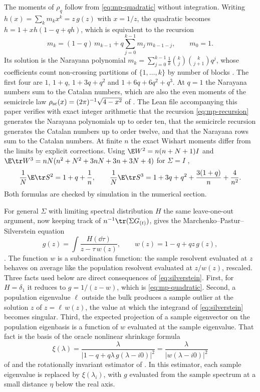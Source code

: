 The moments of $\rho_q$ follow from \eqref{eq:mp-quadratic} without integration. Writing $h(x)=\sum_k m_kx^k=z\,g(z)$ with $x=1/z$, the quadratic becomes $h=1+xh(1-q+qh)$, which is equivalent to the recursion
\begin{equation}
 m_k=(1-q)\,m_{k-1}+q\sum_{j=0}^{k-1}m_j\,m_{k-1-j},\qquad m_0=1.
 \label{eq:mp-recursion}
\end{equation}
Its solution is the Narayana polynomial $m_k=\sum_{j=0}^{k-1}\tfrac1k\binom kj\binom k{j+1}q^j$, whose coefficients count non-crossing partitions of $\{1,\ldots,k\}$ by number of blocks \citep{stanley1999enumerative,nica2006lectures}. The first four are $1$, $1+q$, $1+3q+q^2$ and $1+6q+6q^2+q^3$. At $q=1$ the Narayana numbers sum to the Catalan numbers, which are also the even moments of the semicircle law $\rho_{\rm sc}(x)=(2\pi)^{-1}\sqrt{4-x^2}$ of \citet{wigner1955characteristic,wigner1958distribution}. The Lean file accompanying this paper verifies with exact integer arithmetic that the recursion \eqref{eq:mp-recursion} generates the Narayana polynomials up to order ten, that the semicircle recursion generates the Catalan numbers up to order twelve, and that the Narayana rows sum to the Catalan numbers. At finite $n$ the exact Wishart moments differ from the limits by explicit corrections. Using $\E W^2=n(n+N+1)I$ and $\E\tr W^3=nN(n^2+N^2+3nN+3n+3N+4)$ for $\Sigma=I$ \citep{muirhead1982aspects},
\[
 \frac1N\E\tr S^2=1+q+\frac1n,\qquad
 \frac1N\E\tr S^3=1+3q+q^2+\frac{3(1+q)}n+\frac4{n^2}.
\]
Both formulas are checked by simulation in the numerical section.

For general $\Sigma$ with limiting spectral distribution $H$ the same leave-one-out argument, now keeping track of $n^{-1}\tr(\Sigma G_{(t)})$, gives the Marchenko--Pastur--Silverstein equation
\begin{equation}
 g(z)=\int\frac{H(\dd\tau)}{z-\tau\,w(z)},\qquad w(z)=1-q+qz\,g(z),
 \label{eq:silverstein}
\end{equation}
\citep{silverstein1995empirical}. The function $w$ is a subordination function: the sample resolvent evaluated at $z$ behaves on average like the population resolvent evaluated at $z/w(z)$, rescaled. Three facts used below are direct consequences of \eqref{eq:silverstein}. First, for $H=\delta_1$ it reduces to $g=1/(z-w)$, which is \eqref{eq:mp-quadratic}. Second, a population eigenvalue $\ell$ outside the bulk produces a sample outlier at the solution $z$ of $z=\ell\,w(z)$, the value at which the integrand of \eqref{eq:silverstein} becomes singular. Third, the expected projection of a sample eigenvector on the population eigenbasis is a function of $w$ evaluated at the sample eigenvalue. That fact is the basis of the oracle nonlinear shrinkage formula
\begin{equation}
 \xi(\lambda)=\frac{\lambda}{|1-q+q\lambda\,g(\lambda-i0)|^2}=\frac{\lambda}{|w(\lambda-i0)|^2}
 \label{eq:rie}
\end{equation}
of \citet{ledoit2011eigenvectors} and the rotationally invariant estimator of \citet{bun2016rotational}. In this estimator, each sample eigenvalue is replaced by $\xi(\lambda_i)$, with $g$ evaluated from the sample spectrum at a small distance $\eta$ below the real axis.

